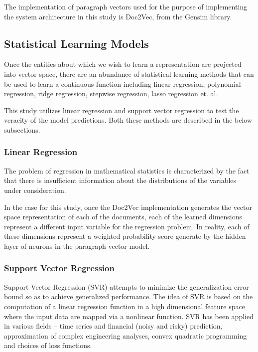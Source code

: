\documentclass[conference]{IEEEtran}
\begin{document}
        The implementation of paragraph vectors used for the purpose of implementing the system architecture in this study is Doc2Vec, from the Gensim library\cite{doc2vec_api}.


    \subsection{Statistical Learning Models}
        Once the entities about which we wish to learn a representation are projected into vector space, there are an abundance of statistical learning methods that can be used to learn a continuous function including linear regression, polynomial regression, ridge regression, stepwise regression, lasso regression et. al.

        This study utilizes linear regression and support vector regression to test the veracity of the model predictions. Both these methods are described in the below subsections.

    \subsubsection{Linear Regression}
        The problem of regression in mathematical statistics is characterized by the fact that there is insufficient information about the distributions of the variables under consideration\cite{regression_analysis}.

        In the case for this study, once the Doc2Vec implementation generates the vector space representation of each of the documents, each of the learned dimensions represent a different input variable for the regression problem. In reality, each of these dimensions represent a weighted probability score generate by the hidden layer of neurons in the paragraph vector model.

    \subsubsection{Support Vector Regression}
        Support Vector Regression (SVR) attempts to minimize the generalization error bound so as to achieve generalized performance. The idea of SVR is based on the computation of a linear regression function in a high dimensional feature space where the input data are mapped via a nonlinear function. SVR has been applied in various fields – time series and financial (noisy and risky) prediction, approximation of complex engineering analyses, convex quadratic programming and choices of loss functions\cite{basak2007support}.
\end{document}
